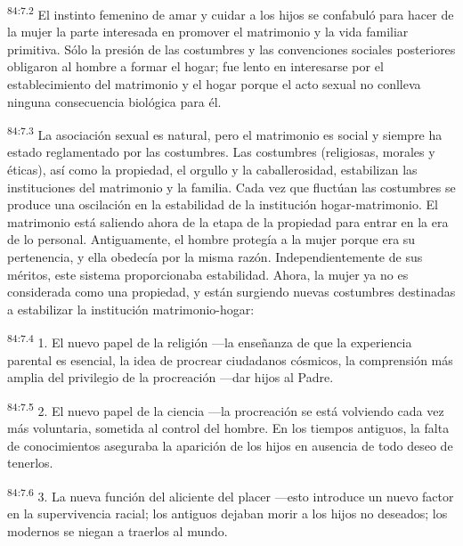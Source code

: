 \documentclass[twoside, 11pt]{book}
\begin{document}
\par
\textsuperscript{84:7.2} El instinto femenino de amar y cuidar a los hijos se confabuló para hacer de la mujer la parte interesada en promover el matrimonio y la vida familiar primitiva. Sólo la presión de las costumbres y las convenciones sociales posteriores obligaron al hombre a formar el hogar; fue lento en interesarse por el establecimiento del matrimonio y el hogar porque el acto sexual no conlleva ninguna consecuencia biológica para él.

\par
\textsuperscript{84:7.3} La asociación sexual es natural, pero el matrimonio es social y siempre ha estado reglamentado por las costumbres. Las costumbres (religiosas, morales y éticas), así como la propiedad, el orgullo y la caballerosidad, estabilizan las instituciones del matrimonio y la familia. Cada vez que fluctúan las costumbres se produce una oscilación en la estabilidad de la institución hogar-matrimonio. El matrimonio está saliendo ahora de la etapa de la propiedad para entrar en la era de lo personal. Antiguamente, el hombre protegía a la mujer porque era su pertenencia, y ella obedecía por la misma razón. Independientemente de sus méritos, este sistema proporcionaba estabilidad. Ahora, la mujer ya no es considerada como una propiedad, y están surgiendo nuevas costumbres destinadas a estabilizar la institución matrimonio-hogar:

\par
\textsuperscript{84:7.4} 1. El nuevo papel de la religión ---la enseñanza de que la experiencia parental es esencial, la idea de procrear ciudadanos cósmicos, la comprensión más amplia del privilegio de la procreación ---dar hijos al Padre.

\par
\textsuperscript{84:7.5} 2. El nuevo papel de la ciencia ---la procreación se está volviendo cada vez más voluntaria, sometida al control del hombre. En los tiempos antiguos, la falta de conocimientos aseguraba la aparición de los hijos en ausencia de todo deseo de tenerlos.

\par
\textsuperscript{84:7.6} 3. La nueva función del aliciente del placer ---esto introduce un nuevo factor en la supervivencia racial; los antiguos dejaban morir a los hijos no deseados; los modernos se niegan a traerlos al mundo.
\end{document}
